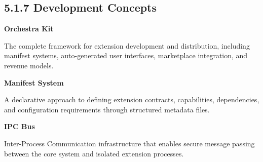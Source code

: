 \subsection*{5.1.7 Development Concepts}

\vspace{0.3cm}

\noindent\textbf{Orchestra Kit}

The complete framework for extension development and distribution, including manifest systems, auto-generated user interfaces, marketplace integration, and revenue models.

\vspace{0.3cm}

\noindent\textbf{Manifest System}

A declarative approach to defining extension contracts, capabilities, dependencies, and configuration requirements through structured metadata files.

\vspace{0.3cm}

\noindent\textbf{IPC Bus}

Inter-Process Communication infrastructure that enables secure message passing between the core system and isolated extension processes.
